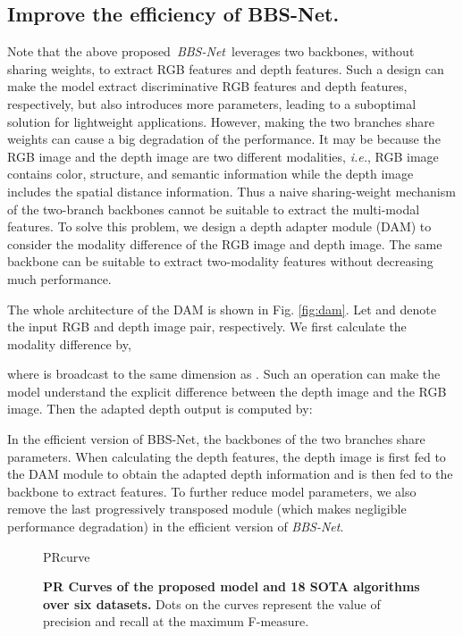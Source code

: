 \documentclass[journal]{IEEEtran}
\newcommand{\figref}[1]{Fig. \ref{#1}}
\def\ie{\emph{i.e.}}
\def\ourmodel{\emph{BBS-Net}}
\begin{document}
\subsection{Improve the efficiency of BBS-Net.}\label{sec:efficiency}
Note that the above proposed~\ourmodel~leverages two backbones, without sharing weights, to extract RGB features and depth features.
Such a design can make the model extract discriminative RGB features and depth features, respectively, but also introduces more parameters, leading to a suboptimal solution for lightweight applications.
However, making the two branches share weights can cause a big degradation of the performance.
It may be because the RGB image and the depth image are two different modalities, \ie, RGB image contains color, structure, and semantic information while the depth image includes the spatial distance information.
Thus a naive sharing-weight mechanism of the two-branch backbones cannot be suitable to extract the multi-modal features.
To solve this problem, we design a depth adapter module (DAM) to consider the modality difference of the RGB image and depth image. The same backbone can be suitable to extract two-modality features without decreasing much performance.
\par
The whole architecture of the DAM is shown in \figref{fig:dam}.
Let  and  denote the input RGB and depth image pair, respectively.
We first calculate the modality difference  by,

where  is broadcast to the same dimension as . 
Such an operation can make the model understand the explicit difference between the depth image and the RGB image.
Then the adapted depth output is computed by:

In the efficient version of BBS-Net, the backbones of the two branches share parameters.
When calculating the depth features, the depth image is first fed to the DAM module to obtain the adapted depth information and is then fed to the backbone to extract features.
To further reduce model parameters, we also remove the last progressively transposed module (which makes negligible performance degradation) in the efficient version of \ourmodel.
\begin{figure*}[t!]
	\small
	\centering
	\begin{overpic}[width=.98\linewidth]{PRcurve}
		
	\end{overpic}
	\vspace{-10pt}
	\caption{ \textbf{PR Curves of the proposed model and 18 SOTA algorithms over six datasets.} Dots on the curves represent the value of precision and recall at the maximum F-measure.}
	\label{fig:prcurve}
\end{figure*}
\end{document}
